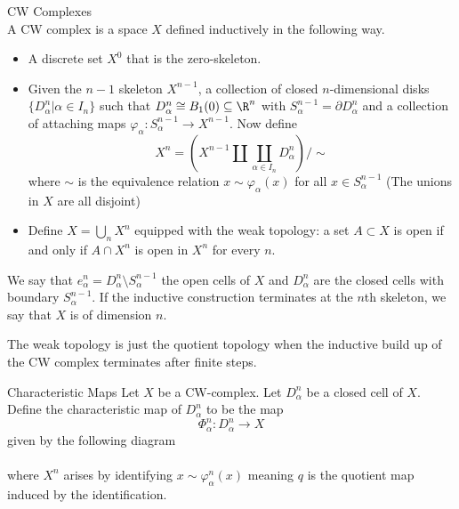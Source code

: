 \documentclass[a4paper]{article}
\begin{document}
\begin{defn}{CW Complexes}{}\\
A CW complex is a space $X$ defined inductively in the following way. 
\begin{itemize}
\item A discrete set $X^0$ that is the zero-skeleton. 
\item Given the $n-1$ skeleton $X^{n-1}$, a collection of closed $n$-dimensional disks $\{D_{\alpha}^n|\alpha\in I_n\}$ such that $D_\alpha^n\cong B_1(0)\subseteq\R^n$ with $S_\alpha^{n-1}=\partial D_\alpha^n$ and a collection of attaching maps $\varphi_\alpha:S_\alpha^{n-1}\to X^{n-1}$. Now define $$X^n=\left(X^{n-1}\amalg\coprod_{\alpha\in I_n}D_\alpha^n\right)/\sim$$ where $\sim$ is the equivalence relation $x\sim\varphi_\alpha(x)$ for all $x\in S_\alpha^{n-1}$ (The unions in $X$ are all disjoint)
\item Define $X=\bigcup_nX^n$ equipped with the weak topology: a set $A\subset X$ is open if and only if $A\cap X^n$ is open in $X^n$ for every $n$. 
\end{itemize}
We say that $e_\alpha^n=D_\alpha^n\setminus S_\alpha^{n-1}$ the open cells of $X$ and $D_\alpha^n$ are the closed cells with boundary $S_\alpha^{n-1}$. If the inductive construction terminates at the $n$th skeleton, we say that $X$ is of dimension $n$. 
\end{defn}

The weak topology is just the quotient topology when the inductive build up of the CW complex terminates after finite steps. 

\begin{defn}{Characteristic Maps}{} Let $X$ be a CW-complex. Let $D_\alpha^n$ be a closed cell of $X$. Define the characteristic map of $D_\alpha^n$ to be the map $$\Phi_\alpha^n:D_\alpha^n\to X$$ given by the following diagram \\
\\
where $X^n$ arises by identifying $x\sim\varphi_\alpha^n(x)$ meaning $q$ is the quotient map induced by the identification. 
\end{defn}
\end{document}
